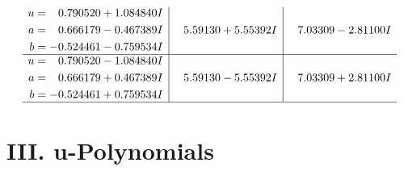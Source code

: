 \documentclass[1p]{elsarticle_modified}
\theoremstyle{definition}
\begin{document}
$$\begin{array}{c|c|c}
\begin{aligned}
u &= \phantom{-}0.790520 + 1.084840 I \\
a &= \phantom{-}0.666179 - 0.467389 I \\
b &= -0.524461 - 0.759534 I\end{aligned}
 & \phantom{-}5.59130 + 5.55392 I & \phantom{-}7.03309 - 2.81100 I \\ \hline\begin{aligned}
u &= \phantom{-}0.790520 - 1.084840 I \\
a &= \phantom{-}0.666179 + 0.467389 I \\
b &= -0.524461 + 0.759534 I\end{aligned}
 & \phantom{-}5.59130 - 5.55392 I & \phantom{-}7.03309 + 2.81100 I\\
 \hline 
 \end{array}$$\newpage
\newpage\renewcommand{\arraystretch}{1}
\centering \section*{ III. u-Polynomials}
\end{document}
